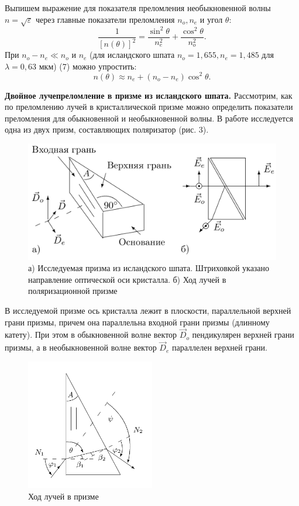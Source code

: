 \documentclass[a4paper, 12pt]{article}%
\begin{document}
Выпишем выражение для показателя преломления необыкновенной волны $n = \sqrt \varepsilon$ через главные показатели преломления $n_o, n_e$ и угол $\theta$:
\begin{equation}
	\frac{1}{\left[ n(\theta) \right] ^ 2} = \frac{\sin^2 \theta}{n^2_e} + \frac{\cos^2 \theta}{n^2_o}.
\end{equation}
При $n_o - n_e \ll n_o$ и $n_e$ (для исландского шпата $n_o = 1,655, n_e = 1,485$ для $\lambda = 0,63$ мкм) (7) можно упростить:
\begin{equation}
	n(\theta) \approx n_e + (n_o - n_e) \cos^2 \theta.
\end{equation}

\noindent \textbf{Двойное лучепреломление в призме из исландского шпата.} Рассмотрим, как по преломлению лучей в кристаллической призме можно определить показатели преломления для обыкновенной и необыкновенной волны. В работе исследуется одна из двух призм, составляющих поляризатор (рис. 3).
\begin{figure}[h!]
	\includegraphics[width = 1.0\linewidth]{images/shpat.png}
	\caption{ а) Исследуемая призма из исландского шпата. Штриховкой указано направление оптической оси кристалла. б) Ход лучей в поляризационной призме}
\end{figure}	
В исследуемой призме ось кристалла лежит в плоскости, параллельной верхней грани призмы, причем она параллельна входной грани призмы (длинному катету). При этом в обыкновенной волне вектор $\vec D_o$ пендикулярен верхней грани призмы, а в необыкновенной волне вектор $\vec D_e$  параллелен верхней грани.
\begin{figure}
    \centering
    \includegraphics[width=0.5\textwidth]{images/prism.png}
    \caption{Ход лучей в призме}
\end{figure} 
\end{document}
